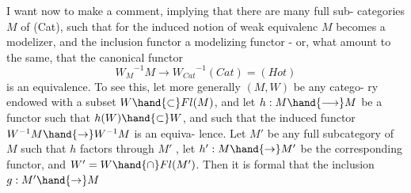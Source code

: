 I want now to make a comment, implying that there are many full sub-%
categories $M$ of (Cat), such that for the induced notion of weak equivalenc
$M$ becomes a modelizer, and the inclusion functor a modelizing functor -
or, what amount to the same, that the canonical functor
\[ {W_M}^{-1}M \longrightarrow {W_{Cat}}^{-1}(Cat) = (Hot) \]
is an equivalence. To see this, let more generally $(M,W)$ be any catego-%
ry endowed with a subset $W \hand{\subset} Fl(M)$, and let $h: M \hand{\longrightarrow} M$ be a functor such
that $h(W) \hand{\subset} W$, and such that the induced functor $W^{-1}M \hand{\to} W^{-1}M$ is an equiva-%
lence. Let   $M'$ be any full subcategory of $M$ such that
$h$ factors through $M'$ , let $h': M \hand{\to} M'$ be the corresponding  functor, and
$W' = W \hand{\cap} Fl(M')$. Then it is formal that  the inclusion $g: M' \hand{\to} M$
